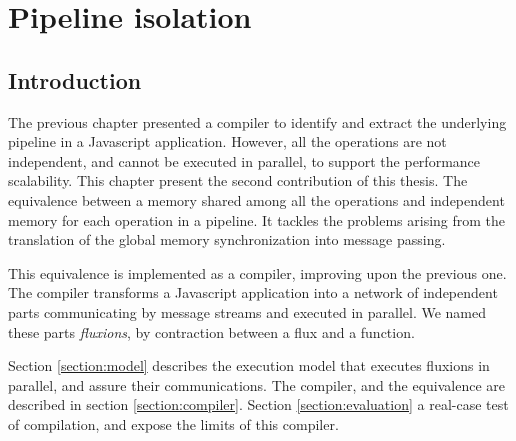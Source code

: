 \chapter{Pipeline isolation} \label{chapter5}

\section{Introduction}

The previous chapter presented a compiler to identify and extract the underlying pipeline in a Javascript application.
However, all the operations are not independent, and cannot be executed in parallel, to support the performance scalability.
This chapter present the second contribution of this thesis.
The equivalence between a memory shared among all the operations and independent memory for each operation in a pipeline.
It tackles the problems arising from the translation of the global memory synchronization into message passing.

This equivalence is implemented as a compiler, improving upon the previous one.
The compiler transforms a Javascript application into a network of independent parts communicating by message streams and executed in parallel.
We named these parts \textit{fluxions}, by contraction between a flux and a function.

Section \ref{section:model} describes the execution model that executes fluxions in parallel, and assure their communications.
The compiler, and the equivalence are described in section \ref{section:compiler}.
Section \ref{section:evaluation} a real-case test of compilation, and expose the limits of this compiler.





